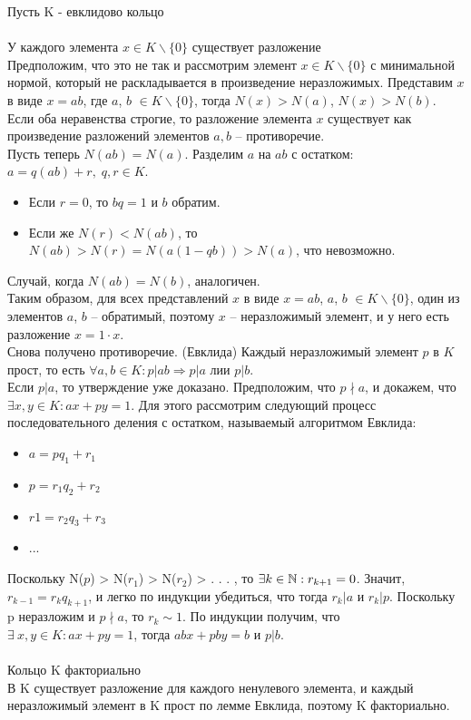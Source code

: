 Пусть K - евклидово кольцо \\ \\
\Lemma  У каждого элемента $x \in K\backslash \{0\}$ существует разложение
\\
\Proof Предположим, что это не так и рассмотрим элемент $x \in K\backslash \{0\}$ с минимальной нормой, который не раскладывается в произведение неразложимых. Представим $x$ в виде $x = ab$, где $a$, $b$ $\in K\backslash \{0\}$, тогда $N(x) > N(a)$, $N(x) > N(b)$.
\\
Если оба неравенства строгие, то разложение элемента $x$ существует как произведение разложений элементов $a, b$ -- противоречие. 
\\
Пусть теперь $N(ab) = N(a)$. Разделим $a$ на $ab$ с остатком: $a = q(ab)+r, \;q, r \in K$. 
\begin{itemize}
    \item Если $r = 0$, то $bq = 1$ и $b$ обратим.
    \item  Если же $N(r) < N(ab)$,
то $N(ab) > N(r) = N(a(1 - q b)) > N(a)$,
что невозможно.
\end{itemize}
 Случай, когда $N(ab) = N(b)$, аналогичен.
\\
Таким образом, для всех представлений $x$ в виде $x = ab$, $a$, $b$ $\in K\backslash \{0\}$, один из элементов
$a$, $b$ -- обратимый, поэтому $x$ -- неразложимый элемент, и у него есть разложение $x = 1 \cdot x$.\\
Снова получено противоречие. \EndProof
\bigbreak 
\noindent \Lemma (Евклида) Каждый неразложимый элемент $p$ в $K$ прост, то есть $\forall a, b \in K : p | ab \Longrightarrow p | a $ лии $p | b$.
\\
\Proof Если $p | a$, то утверждение уже доказано. Предположим, что $p \nmid a$,
и докажем, что $\exists x, y \in K : a x + p y = 1$. Для этого рассмотрим следующий процесс последовательного деления с остатком, называемый алгоритмом Евклида:
\begin{itemize}
    \item []$a = p q_1 + r_1$
    \item [] $p = r_1q_2 + r_2$
    \item [] $r1 = r_2 q_3 + r_3$
    \item[] ...
\end{itemize}
Поскольку N($p$) > N($r_1$) > N($r_2$) > . . . , то $\exists k \in \mathbb{N} : r_{k+1} = 0$. Значит, $r_{k-1} = r_k q_{k+1}$, и легко по индукции убедиться, что тогда $r_k | a$ и $r_k | p$. Поскольку p неразложим и $p \nmid a$, то
$r_k \sim 1$. По индукции получим, что $\exists \ x, y \in K : a x + p y = 1$, тогда $abx + pby = b$ и $p | b$.\EndProof
\\
\\
\Th  Кольцо K факториально \\
\Proof В K существует разложение для каждого ненулевого элемента, и каждый неразложимый элемент в K прост по лемме Евклида, поэтому K факториально. \EndProof